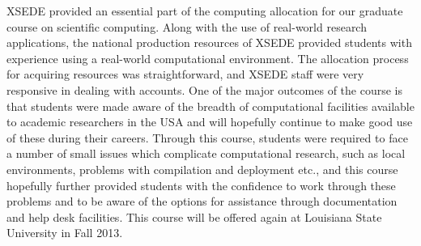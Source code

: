 \documentclass[11pt]{article}
\begin{document}
XSEDE provided an essential part of the computing allocation for our graduate
course on scientific computing. Along with the use of real-world research
applications, the national production resources of XSEDE provided students with
experience using a real-world computational environment. The allocation process
for acquiring resources was straightforward, and XSEDE staff were very
responsive in dealing with accounts. One of the major outcomes of the course is
that students were made aware of the breadth of computational facilities
available to academic researchers in the USA and will hopefully continue to
make good use of these during their careers. Through this course, students were
required to face a number of small issues which complicate computational
research, such as local environments, problems with compilation and deployment
etc., and this course hopefully further provided students with the confidence
to work through these problems and to be aware of the options for assistance
through documentation and help desk facilities.  This course will be offered
again at Louisiana State University in Fall 2013.



\end{document}
